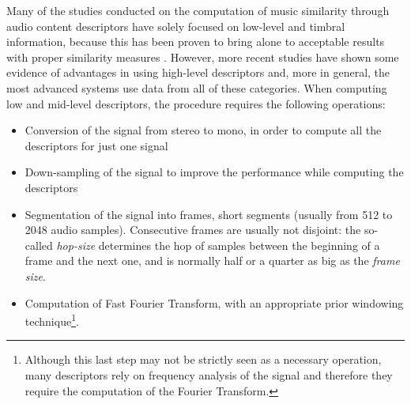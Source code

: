Many of the studies conducted on the computation of music similarity through audio content descriptors have solely focused on low-level and timbral information, because this has been proven to bring alone to acceptable results with proper similarity measures \cite{mirage07}. However, more recent studies have shown some evidence of advantages in using high-level descriptors \cite{barrington07} \cite{west07} and, more in general, the most advanced systems use data from all of these categories. When computing low and mid-level descriptors, the procedure requires the following operations:
\begin{itemize}
\item Conversion of the signal from stereo to mono, in order to compute all the descriptors for just one signal
\item Down-sampling of the signal to improve the performance while computing the descriptors
\item Segmentation of the signal into frames, short segments (usually from 512 to 2048 audio samples). Consecutive frames are usually not disjoint: the so-called \textit{hop-size} determines the hop of samples between the beginning of a frame and the next one, and is normally half or a quarter as big as the \textit{frame size}.
\item Computation of Fast Fourier Transform, with an appropriate prior windowing technique\footnote{Although this last step may not be strictly seen as a necessary operation, many descriptors rely on frequency analysis of the signal and therefore they require the computation of the Fourier Transform.}.
\end{itemize}


